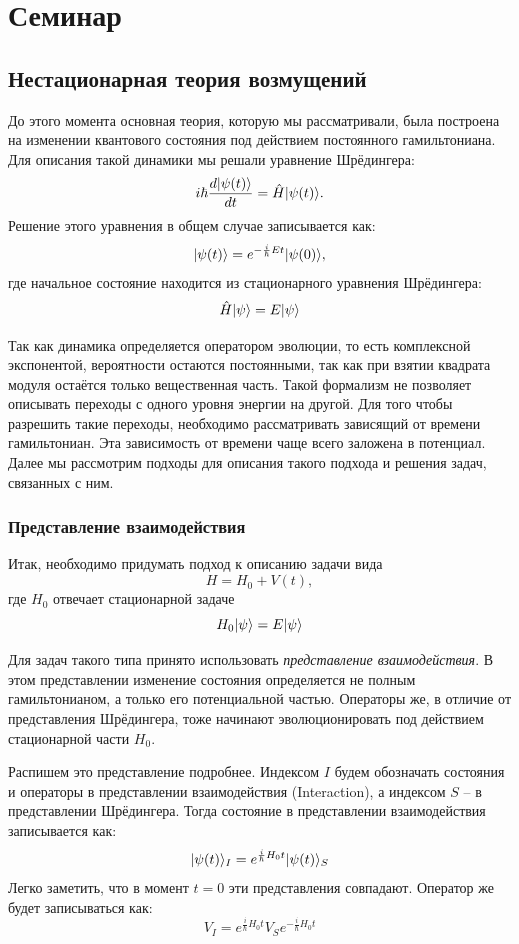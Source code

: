\section{Семинар \thesection}
\subsection{Нестационарная теория возмущений}

До этого момента основная теория, которую мы рассматривали, была построена на
изменении квантового состояния под действием постоянного гамильтониана. Для
описания такой динамики мы решали уравнение Шрёдингера:
\[
  i\hbar\frac{d\lvert\psi(t)\rangle}{dt} = \hat{H}\lvert\psi(t)\rangle.
\]
Решение этого уравнения в общем случае записывается как:
\[
  \lvert\psi(t)\rangle = e^{-\frac{i}{\hbar}Et}\lvert\psi(0)\rangle,
\]
где начальное состояние находится из стационарного уравнения Шрёдингера:
\[
  \hat{H}\lvert\psi\rangle = E\lvert\psi\rangle
\]

Так как динамика определяется оператором эволюции, то есть комплексной
экспонентой, вероятности остаются постоянными, так как при взятии квадрата
модуля остаётся только вещественная часть. Такой формализм не позволяет
описывать переходы с одного уровня энергии на другой. Для того чтобы разрешить
такие переходы, необходимо рассматривать зависящий от времени гамильтониан. Эта
зависимость от времени чаще всего заложена в потенциал. Далее мы рассмотрим
подходы для описания такого подхода и решения задач, связанных с ним.

\subsubsection{Представление взаимодействия}
Итак, необходимо придумать подход к описанию задачи вида
\[
  H = H_0 + V(t),
\]
где $H_0$ отвечает стационарной задаче
\[
  H_0\lvert\psi\rangle = E\lvert\psi\rangle
\]

Для задач такого типа принято использовать \textit{представление
  взаимодействия}. В этом представлении изменение состояния определяется не
полным гамильтонианом, а только его потенциальной частью. Операторы же, в
отличие от представления Шрёдингера, тоже начинают эволюционировать под
действием стационарной части $H_0$.

Распишем это представление подробнее. Индексом $I$ будем обозначать состояния и
операторы в представлении взаимодействия (Interaction), а индексом $S$ -- в
представлении Шрёдингера. Тогда состояние в представлении взаимодействия
записывается как:
\[
  \lvert\psi(t)\rangle_I = e^{\frac{i}{\hbar} H_0 t}\lvert\psi(t)\rangle_S
\]
Легко заметить, что в момент $t=0$ эти представления совпадают. Оператор же
будет записываться как:
\[
  V_I = e^{\frac{i}{\hbar} H_0 t} V_S e^{-\frac{i}{\hbar} H_0 t}
\]

